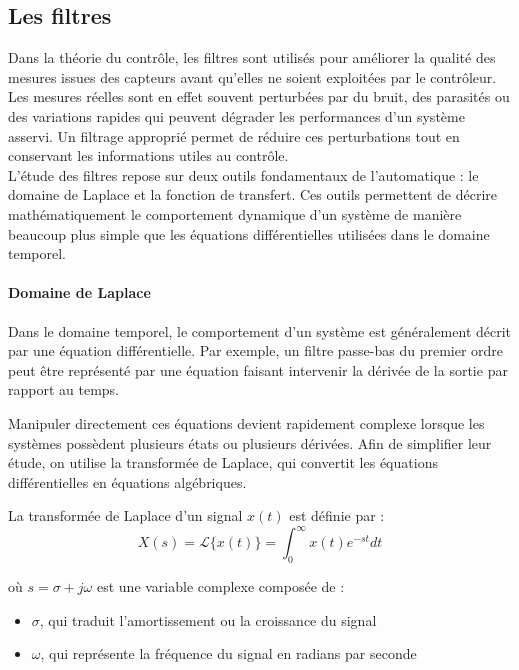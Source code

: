 \subsection{Les filtres}
\label{sec:filtres}

Dans la théorie du contrôle, les filtres sont utilisés pour améliorer la qualité des mesures issues des capteurs avant qu'elles ne soient exploitées par le contrôleur. Les mesures réelles sont en effet souvent perturbées par du bruit, des parasités ou des variations rapides qui peuvent dégrader les performances d'un système asservi. Un filtrage approprié permet de réduire ces perturbations tout en conservant les informations utiles au contrôle. \\

L'étude des filtres repose sur deux outils fondamentaux de l'automatique : le domaine de Laplace et la fonction de transfert. Ces outils permettent de décrire mathématiquement le comportement dynamique d'un système de manière beaucoup plus simple que les équations différentielles utilisées dans le domaine temporel. \\

\paragraph{Domaine de Laplace}

Dans le domaine temporel, le comportement d'un système est généralement décrit par une équation différentielle. Par exemple, un filtre passe-bas du premier ordre peut être représenté par une équation faisant intervenir la dérivée de la sortie par rapport au temps. 

Manipuler directement ces équations devient rapidement complexe lorsque les systèmes possèdent plusieurs états ou plusieurs dérivées. Afin de simplifier leur étude, on utilise la transformée de Laplace, qui convertit les équations différentielles en équations algébriques.

La transformée de Laplace d'un signal $x(t)$ est définie par :
\begin{equation}
    X(s) = \mathcal{L}\{x(t)\} = \int_{0}^{\infty} x(t) e^{-st} dt
\end{equation}

où $s = \sigma + j\omega$ est une variable complexe composée de :
\begin{itemize}
    \item $\sigma$, qui traduit l'amortissement ou la croissance du signal
    \item $\omega$, qui représente la fréquence du signal en radians par seconde
\end{itemize}

